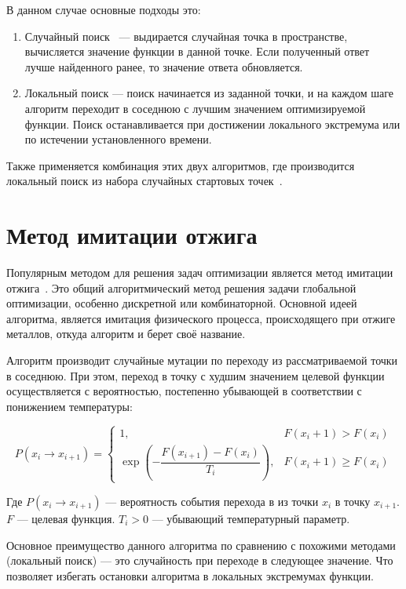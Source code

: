 В данном случае основные подходы это:
\begin{enumerate}
    \item Случайный поиск~\cite{random} --- выдирается случайная точка в пространстве,
    вычисляется значение функции в данной точке. Если полученный ответ лучше
    найденного ранее, то значение ответа обновляется.
    \item Локальный поиск --- поиск начинается из заданной точки, и на каждом шаге
    алгоритм переходит в соседнюю с лучшим значением оптимизируемой функции. Поиск
    останавливается при достижении локального экстремума или по истечении
    установленного времени.
\end{enumerate}

Также применяется комбинация этих двух алгоритмов, где производится локальный
поиск из набора случайных стартовых точек~\cite{local}.

\section{Метод имитации отжига}\label{sec:od}

Популярным методом для решения задач оптимизации является метод имитации
отжига~\cite{od}. Это общий алгоритмический метод решения задачи глобальной
оптимизации, особенно дискретной или комбинаторной. Основной идеей алгоритма,
является имитация физического процесса, происходящего при отжиге металлов,
откуда алгоритм и берет своё название.

Алгоритм производит случайные мутации по переходу из рассматриваемой точки
в соседнюю. При этом, переход в точку с худшим значением целевой функции
осуществляется с вероятностью, постепенно убывающей в соответствии с понижением
температуры:

\[
P(x_i \to x_{i+1}) =
\begin{cases}
    1,                                                  & F(x_i+1) > F(x_i) \\
    \exp \left(-\dfrac{F(x_{i+1})-F(x_i)}{T_i}\right),  & F(x_i+1) \geqslant F(x_i)
\end{cases}
\]

Где $P(x_i \to x_{i+1})$ --- вероятность события перехода в из точки $x_i$
в точку $x_{i+1}$. $F$ --- целевая функция. $T_i > 0$ --- убывающий
температурный параметр.

Основное преимущество данного алгоритма по сравнению с похожими методами
(локальный поиск) --- это случайность при переходе в следующее значение. Что
позволяет избегать остановки алгоритма в локальных экстремумах функции.

